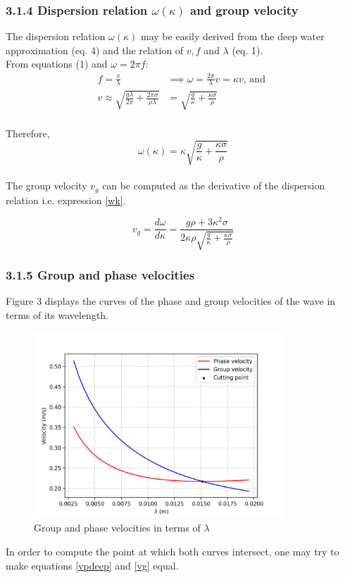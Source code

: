 \documentclass[a4paper, 12pt]{article}
\begin{document}
		
		\subsubsection{3.1.4  Dispersion relation $\omega(\kappa)$ and group velocity}
		The dispersion relation $\omega(\kappa)$ may be easily derived from the deep water approximation (eq. 4) and the relation of $v, f$ and $\lambda$ (eq. 1). \\
		
			From equations (1) and $\omega = 2\pi f$:
			\begin{align*}
				f = \frac{v}{\lambda} &\implies \omega = \frac{2\pi}{\lambda} v = \kappa v 
				\mbox{, and }\\
				v \approx \sqrt{\frac{g\lambda}{2\pi} + \frac{2\pi \sigma}{\rho \lambda}} &=   \sqrt{\frac{g}{\kappa} + \frac{\kappa \sigma}{\rho}}
			\end{align*}\\
		
		Therefore,
			\begin{equation}\label{wk}
				\omega(\kappa) = \kappa \sqrt{\frac{g}{\kappa} + \frac{\kappa \sigma}{\rho}}
			\end{equation}\\
		
		The group velocity $v_g$ can be computed as the derivative of the dispersion relation i.e. expression \ref{wk}.
		
		\begin{equation}\label{vg}
		v_g = \frac{d\omega}{d\kappa} = \frac{g\rho + 3\kappa^2\sigma}{2\kappa\rho \sqrt{\frac{g}{\kappa} + \frac{\kappa \sigma}{\rho}}}
		\end{equation}
		
		\subsubsection{3.1.5 Group and phase velocities}
		Figure 3 displays the curves of the phase and group velocities of the wave in terms of its wavelength.
		
		\begin{figure}[h!]
			\centering
			\includegraphics[height=7cm]{cutvelocity}
			\caption{Group and phase velocities in terms of $\lambda$}
		\end{figure}
	In order to compute the point at which both curves intersect, one may try to make equations \ref{vpdeep} and \ref{vg} equal.
\end{document}
